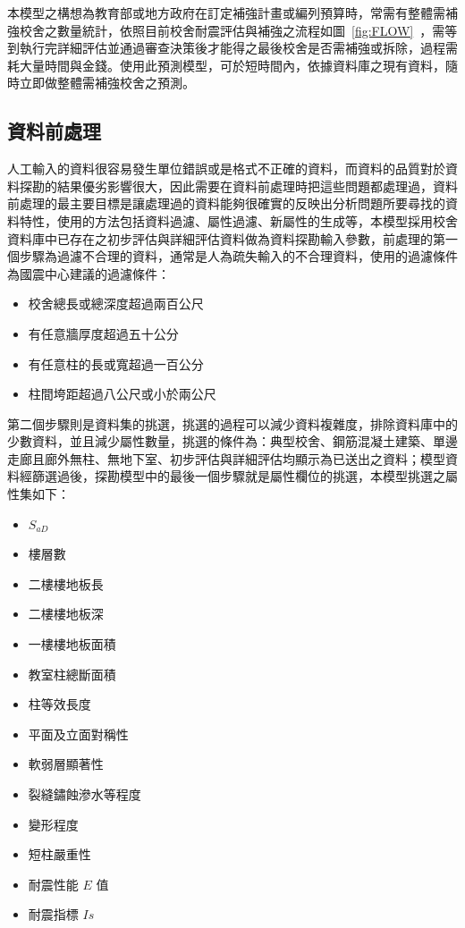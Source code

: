本模型之構想為教育部或地方政府在訂定補強計畫或編列預算時，常需有整體需補強校舍之數量統計，依照目前校舍耐震評估與補強之流程如圖~\ref{fig:FLOW}~，需等到執行完詳細評估並通過審查決策後才能得之最後校舍是否需補強或拆除，過程需耗大量時間與金錢。使用此預測模型，可於短時間內，依據資料庫之現有資料，隨時立即做整體需補強校舍之預測。

\subsection{資料前處理}

人工輸入的資料很容易發生單位錯誤或是格式不正確的資料，而資料的品質對於資料探勘的結果優劣影響很大，因此需要在資料前處理時把這些問題都處理過，資料前處理的最主要目標是讓處理過的資料能夠很確實的反映出分析問題所要尋找的資料特性，使用的方法包括資料過濾、屬性過濾、新屬性的生成等，本模型採用校舍資料庫中已存在之初步評估與詳細評估資料做為資料探勘輸入參數，前處理的第一個步驟為過濾不合理的資料，通常是人為疏失輸入的不合理資料，使用的過濾條件為國震中心建議的過濾條件：

\begin{itemize}
\item 校舍總長或總深度超過兩百公尺
\item 有任意牆厚度超過五十公分
\item 有任意柱的長或寬超過一百公分
\item 柱間垮距超過八公尺或小於兩公尺
\end{itemize}

第二個步驟則是資料集的挑選，挑選的過程可以減少資料複雜度，排除資料庫中的少數資料，並且減少屬性數量，挑選的條件為：典型校舍、鋼筋混凝土建築、單邊走廊且廊外無柱、無地下室、初步評估與詳細評估均顯示為已送出之資料；模型資料經篩選過後，探勘模型中的最後一個步驟就是屬性欄位的挑選，本模型挑選之屬性集如下：


\begin{multicols}{2}
\begin{itemize}
\item $S_{aD}$
\item 樓層數
\item 二樓樓地板長
\item 二樓樓地板深
\item 一樓樓地板面積
\item 教室柱總斷面積
\item 柱等效長度
\item 平面及立面對稱性
\item 軟弱層顯著性
\item 裂縫鏽蝕滲水等程度
\item 變形程度
\item 短柱嚴重性
\item 耐震性能 $E$ 值
\item 耐震指標 $Is$
\end{itemize}
\end{multicols}


